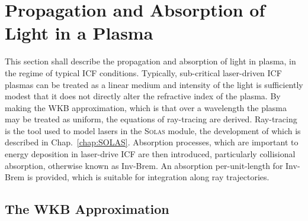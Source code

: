 \section{Propagation and Absorption of Light in a Plasma}%
\label{sec:theory_propagation}

This section shall describe the propagation and absorption of light in plasma, in the regime of typical \ac{ICF} conditions.
Typically, sub-critical laser-driven \ac{ICF} plasmas can be treated as a linear medium and intensity of the light is sufficiently modest that it does not directly alter the refractive index of the plasma.
By making the WKB approximation, which is that over a wavelength the plasma may be treated as uniform, the equations of ray-tracing are derived.
Ray-tracing is the tool used to model lasers in the \textsc{Solas} module, the development of which is described in Chap.~\ref{chap:SOLAS}.
Absorption processes, which are important to energy deposition in laser-drive \ac{ICF} are then introduced, particularly collisional absorption, otherwise known as \ac{Inv-Brem}.
An absorption per-unit-length for \ac{Inv-Brem} is provided, which is suitable for integration along ray trajectories.

\subsection{The WKB Approximation}%
\label{sec:theory_WKB}

